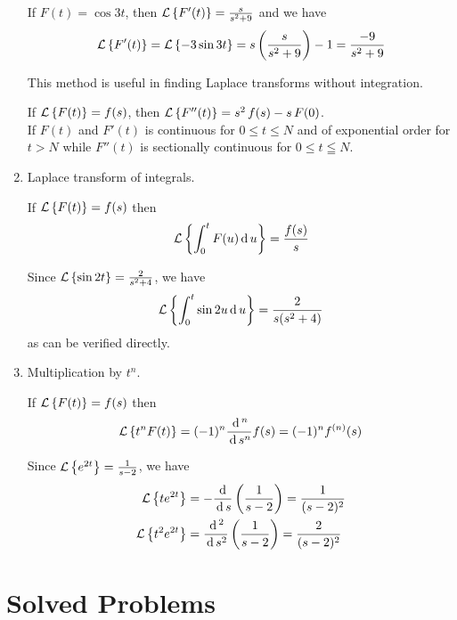 \documentclass[../main-sheet.tex]{subfiles}
\begin{document}
\begin{enumerate}
\begin{thm}
        \end{thm}
        \begin{ex}
            If $ F(t)=\cos 3t $, then $ \mathcal{L}\left\{ F'(t)\right\}=\frac{s}{s^2+9} $ and we have 
            \[
                \mathcal{L}\left\{ F'(t)\right\}=\mathcal{L}\left\{ -3\sin 3t \right\}=s\left( \frac{s}{s^2+9} \right)-1=\frac{-9}{s^2+9}
            \]
        \end{ex}
        This method is useful in finding Laplace transforms without integration.
        \begin{thm}\label{thm:lapder2}
            If $ \mathcal{L}\left\{ F(t)\right\}=f(s) $, then $ \mathcal{L}\left\{ F''(t)\right\}=s^2\,f(s)-s\,F(0) $.\\
            If $ F(t) $ and $ F'(t) $ is continuous for $ 0\leq t \leq N $ and of exponential order for $ t>N $ while $ F''(t) $ is sectionally continuous for $ 0\leq t\leqq N $.
        \end{thm}
    \item Laplace transform of integrals.
        \begin{thm}
            If $ \mathcal{L}\left\{ F(t)\right\}=f(s) $ then 
            \[ \mathcal{L}\left\{ \int_0^t F(u)\,\mathrm{d}\, u\right\}=\frac{f(s)}{s}\]
        \end{thm}
        \begin{ex}
            Since $ \mathcal{L}\left\{ \sin 2t\right\}=\frac{2}{s^2+4} $, we have 
            \[ \mathcal{L}\left\{ \int_0^t \sin 2u \,\mathrm{d}\, u\right\}=\frac{2}{s(s^2+4)}\]
            as can be verified directly.
        \end{ex}
    \item Multiplication by $ t^n $.
        \begin{thm}
            \label{thm:lapmul}
            If $ \mathcal{L}\left\{ F(t)\right\}=f(s) $ then 
            \[ \mathcal{L}\left\{ t^n F(t)\right\}=(-1)^n\frac{\,\mathrm{d}\,^n}{\,\mathrm{d}\, s^n}f(s)=(-1)^n f^{(n)}(s)\]
        \end{thm}
        \begin{ex}
            Since $ \mathcal{L}\left\{ e^{2t}\right\}=\frac{1}{s-2} $, we have
            \begin{align*}
                \mathcal{L}\left\{ te^{2t}\right\}&=-\frac{\,\mathrm{d}\,}{\,\mathrm{d}\, s}\left( \frac{1}{s-2} \right)=\frac{1}{(s-2)^2}\\
                \mathcal{L}\left\{ t^2e^{2t}\right\}&=\frac{\,\mathrm{d}\,^2}{\,\mathrm{d}\, s^2}\left( \frac{1}{s-2} \right)=\frac{2}{(s-2)^2}\\
            \end{align*}
        \end{ex}
\end{enumerate}
\section{Solved Problems}
\end{document}
